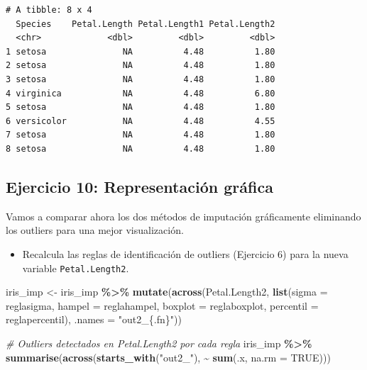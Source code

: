 \documentclass[
]{article}
\newenvironment{Shaded}{\begin{snugshade}}{\end{snugshade}}
\newcommand{\AttributeTok}[1]{\textcolor[rgb]{0.13,0.29,0.53}{#1}}
\newcommand{\CommentTok}[1]{\textcolor[rgb]{0.56,0.35,0.01}{\textit{#1}}}
\newcommand{\ConstantTok}[1]{\textcolor[rgb]{0.56,0.35,0.01}{#1}}
\newcommand{\FunctionTok}[1]{\textcolor[rgb]{0.13,0.29,0.53}{\textbf{#1}}}
\newcommand{\NormalTok}[1]{#1}
\newcommand{\OtherTok}[1]{\textcolor[rgb]{0.56,0.35,0.01}{#1}}
\newcommand{\SpecialCharTok}[1]{\textcolor[rgb]{0.81,0.36,0.00}{\textbf{#1}}}
\newcommand{\StringTok}[1]{\textcolor[rgb]{0.31,0.60,0.02}{#1}}
\providecommand{\tightlist}{%
  \setlength{\itemsep}{0pt}\setlength{\parskip}{0pt}}
\begin{document}
\begin{verbatim}
# A tibble: 8 x 4
  Species    Petal.Length Petal.Length1 Petal.Length2
  <chr>             <dbl>         <dbl>         <dbl>
1 setosa               NA          4.48          1.80
2 setosa               NA          4.48          1.80
3 setosa               NA          4.48          1.80
4 virginica            NA          4.48          6.80
5 setosa               NA          4.48          1.80
6 versicolor           NA          4.48          4.55
7 setosa               NA          4.48          1.80
8 setosa               NA          4.48          1.80
\end{verbatim}

\subsection{Ejercicio 10: Representación
gráfica}\label{ejercicio-10-representaciuxf3n-gruxe1fica}

Vamos a comparar ahora los dos métodos de imputación gráficamente
eliminando los outliers para una mejor visualización.

\begin{itemize}
\tightlist
\item
  Recalcula las reglas de identificación de outliers (Ejercicio 6) para
  la nueva variable \texttt{Petal.Length2}.
\end{itemize}

\begin{Shaded}
\begin{Highlighting}[]
\NormalTok{iris\_imp }\OtherTok{\textless{}{-}}\NormalTok{ iris\_imp }\SpecialCharTok{\%\textgreater{}\%}
  \FunctionTok{mutate}\NormalTok{(}\FunctionTok{across}\NormalTok{(Petal.Length2,}
                \FunctionTok{list}\NormalTok{(}\AttributeTok{sigma     =}\NormalTok{ reglasigma,}
                     \AttributeTok{hampel    =}\NormalTok{ reglahampel,}
                     \AttributeTok{boxplot   =}\NormalTok{ reglaboxplot,}
                     \AttributeTok{percentil =}\NormalTok{ reglapercentil),}
                \AttributeTok{.names =} \StringTok{"out2\_\{.fn\}"}\NormalTok{))}

\CommentTok{\# Outliers detectados en Petal.Length2 por cada regla}
\NormalTok{iris\_imp }\SpecialCharTok{\%\textgreater{}\%} \FunctionTok{summarise}\NormalTok{(}\FunctionTok{across}\NormalTok{(}\FunctionTok{starts\_with}\NormalTok{(}\StringTok{"out2\_"}\NormalTok{), }\SpecialCharTok{\textasciitilde{}} \FunctionTok{sum}\NormalTok{(.x, }\AttributeTok{na.rm =} \ConstantTok{TRUE}\NormalTok{)))}
\end{Highlighting}
\end{Shaded}
\end{document}
